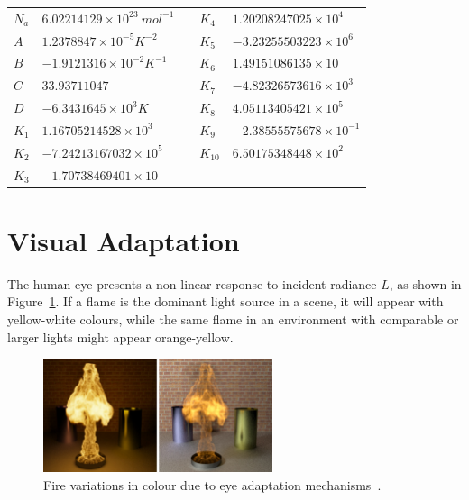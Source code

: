 \begin{table}[htbp!]
\begin{tabular}{|l|l|l|l|l|}
$N_a$ & $6.02214129 \times 10^{23}~mol^{-1}$ &  & $K_4$  & $1.20208247025 \times 10^{4}$   \\ \cline{1-2} \cline{4-5} 
$A$   & $1.2378847 \times 10^{-5} K^{-2}$    &  & $K_5$  & $-3.23255503223 \times 10^{6}$  \\ \cline{1-2} \cline{4-5} 
$B$   & $-1.9121316 \times 10^{-2} K^{-1}$   &  & $K_6$  & $1.49151086135 \times 10$       \\ \cline{1-2} \cline{4-5} 
$C$   & $33.93711047$                        &  & $K_7$  & $-4.82326573616 \times 10^{3}$  \\ \cline{1-2} \cline{4-5} 
$D$   & $-6.3431645 \times 10^3 K$           &  & $K_8$  & $4.05113405421 \times 10^{5}$   \\ \cline{1-2} \cline{4-5} 
$K_1$ & $1.16705214528 \times 10^{3}$        &  & $K_9$  & $-2.38555575678 \times 10^{-1}$ \\ \cline{1-2} \cline{4-5} 
$K_2$ & $-7.24213167032 \times 10^{5}$       &  & $K_{10}$ & $6.50175348448 \times 10^{2}$   \\ \cline{1-2} \cline{4-5} 
$K_3$ & $-1.70738469401 \times 10$           &  &        &                                 \\ \cline{1-2} \cline{4-5}
\end{tabular}
\end{table}
\renewcommand{\arraystretch}{1} %

\FloatBarrier
\section{Visual Adaptation}
\label{sec:visual_adaptation}

The human eye presents a non-linear response to incident radiance $L$, as shown in Figure~\ref{fig:pegoraro_2006_adaptation}.
If a flame is the dominant light source in a scene, it will appear with yellow-white colours, while the same flame in an environment with comparable or larger lights might appear orange-yellow.

\begin{figure}[htbp!]
	\centering
	\includegraphics[width=0.6\textwidth]{img/pegoraro_2006_adaptation}
	\caption{Fire variations in colour due to eye adaptation mechanisms~\cite{Pegoraro:2006}.}
	\label{fig:pegoraro_2006_adaptation}
\end{figure}

